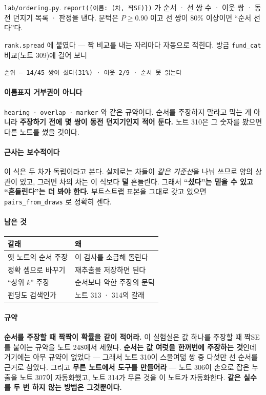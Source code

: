 \documentclass[10pt]{article}
\begin{document}
\texttt{lab/ordering.py}. \texttt{report(\{이름: (차, 짝SE)\})} 가 순서 ·
선 쌍 수 · 이웃 쌍 · 동전 던지기 목록 · 판정을 낸다. 문턱은 $P{\ge}0.90$
이고 선 쌍이 80\% 이상이면 ``순서 선다''다.

\texttt{rank.spread} 에 붙였다 --- 짝 비교를 내는 자리마다 자동으로 적힌다.
방금 \texttt{fund\_cat} 비교(노트 309)에 걸어 보니

\begin{center}\footnotesize
\texttt{순위 --- 14/45 쌍이 섰다(31\%) · 이웃 2/9 · 순서 못 읽는다}
\end{center}

\paragraph{이름표지 거부권이 아니다} \texttt{hearing} · \texttt{overlap} ·
\texttt{marker} 와 같은 규약이다. 순서를 주장하지 말라고 막는 게 아니라
\textbf{주장하기 전에 몇 쌍이 동전 던지기인지 적어 둔다.} 노트 310은 그
숫자를 봤으면 다른 노트를 썼을 것이다.

\paragraph{근사는 보수적이다} 이 식은 두 차가 독립이라고 본다. 실제로는
차들이 \emph{같은 기준선}을 나눠 쓰므로 양의 상관이 있고, 그러면 차의 차는
이 식보다 \textbf{덜} 흔들린다. 그래서 \textbf{``섰다''는 믿을 수 있고
``흔들린다''는 더 봐야 한다.} 부트스트랩 표본을 그대로 갖고 있으면
\texttt{pairs\_from\_draws} 로 정확히 센다.

\paragraph{남은 것}
\begin{center}\small
\begin{tabular}{ll}
\hline
갈래 & 왜 \\
\hline
옛 노트의 순서 주장 & 이 검사를 소급해 돌린다 \\
정확 셈으로 바꾸기 & 재추출을 저장하면 된다 \\
``상위 $k$'' 주장 & 순서보다 약한 주장의 문턱 \\
펀딩도 검색인가 & 노트 313 · 314의 갈래 \\
\hline
\end{tabular}
\end{center}

\paragraph{규약} \textbf{순서를 주장할 때 짝짝이 확률을 같이 적어라.}
이 실험실은 값 하나를 주장할 때 짝SE 를 붙이는 규약을 노트 248에서 세웠다.
\textbf{순서는 값 여럿을 한꺼번에 주장하는 것}인데 거기에는 아무 규약이
없었다 --- 그래서 노트 310이 스물여덟 쌍 중 다섯만 선 순서를 근거로 삼았다.
그리고 \textbf{무른 노트에서 도구를 만들어라} --- 노트 306이 손으로 잡은
누출을 노트 307이 자동화했고, 노트 314가 무른 것을 이 노트가 자동화한다.
\textbf{같은 실수를 두 번 하지 않는 방법은 그것뿐이다.}
\end{document}
